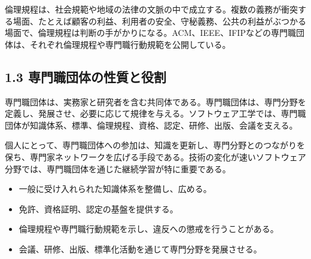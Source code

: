 \documentclass[uplatex,dvipdfmx,a4paper,11pt]{jsarticle}
\begin{document}
倫理規程は、社会規範や地域の法律の文脈の中で成立する。複数の義務が衝突する場面、たとえば顧客の利益、利用者の安全、守秘義務、公共の利益がぶつかる場面で、倫理規程は判断の手がかりになる。ACM、IEEE、IFIPなどの専門職団体は、それぞれ倫理規程や専門職行動規範を公開している。

\begin{center}
\end{center}

\begin{center}
\end{center}

\subsection*{1.3 専門職団体の性質と役割}


専門職団体は、実務家と研究者を含む共同体である。専門職団体は、専門分野を定義し、発展させ、必要に応じて規律を与える。ソフトウェア工学では、専門職団体が知識体系、標準、倫理規程、資格、認定、研修、出版、会議を支える。

個人にとって、専門職団体への参加は、知識を更新し、専門分野とのつながりを保ち、専門家ネットワークを広げる手段である。技術の変化が速いソフトウェア分野では、専門職団体を通じた継続学習が特に重要である。

\begin{itemize}[leftmargin=2em]

\item 一般に受け入れられた知識体系を整備し、広める。

\item 免許、資格証明、認定の基盤を提供する。

\item 倫理規程や専門職行動規範を示し、違反への懲戒を行うことがある。

\item 会議、研修、出版、標準化活動を通じて専門分野を発展させる。

\end{itemize}
\end{document}
